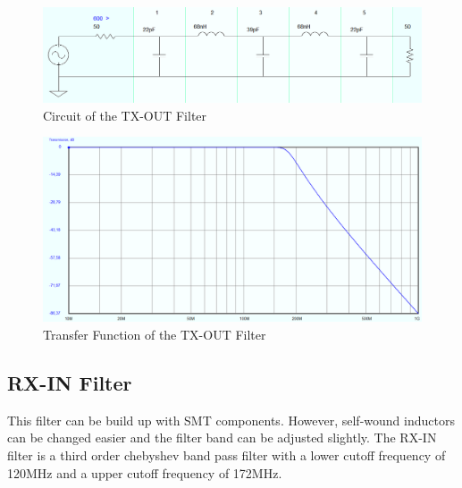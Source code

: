 \begin{figure}[ht!]
	\centering
	\includegraphics[width = 17cm]{./2_circuit/fig/TX-OUT Filter_Circuit}
	\caption{Circuit of the TX-OUT Filter}
	\label{fig:TX-OUT Filter_Circuit}
\end{figure}
\bigskip
\begin{figure}[ht!]
	\centering
	\includegraphics[width = 17cm]{./2_circuit/fig/TX-OUT Filter_TF}
	\caption{Transfer Function of the TX-OUT Filter}
	\label{fig:TX-OUT Filter_TF}
\end{figure}

\newpage
\subsection{RX-IN Filter}
This filter can be build up with SMT components. However, self-wound inductors can be changed easier and the filter band can be adjusted slightly.
The RX-IN filter is a third order chebyshev band pass filter with a lower cutoff frequency of 120MHz and a upper cutoff frequency of 172MHz.

